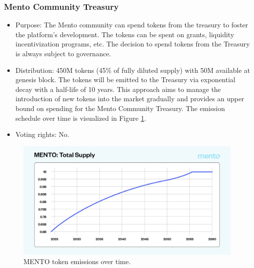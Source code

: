 \documentclass[a4paper]{article}
\theoremstyle{definition}
\begin{document}
\subsubsection*{Mento Community Treasury}
\begin{itemize}
    \item Purpose: The Mento community can spend tokens from the treasury to foster the platform's development. The tokens can be spent on grants, liquidity incentivization programs, etc. The decision to spend tokens from the Treasury is always subject to governance.
    \item Distribution: 450M tokens (45\% of fully diluted supply) with 50M available at genesis block. The tokens will be emitted to the Treasury via exponential decay with a half-life of 10 years. This approach aims to manage the introduction of new tokens into the market gradually and provides an upper bound on spending for the Mento Community Treasury. The emission schedule over time is visualized in Figure \ref{fig:mento_emissions}.
    \item Voting rights: No.
\end{itemize}
\begin{figure}[ht]
    \centering
    \includegraphics[width=1\linewidth]{figures/mento_emissions.png}
    \caption{MENTO token emissions over time.}
    \label{fig:mento_emissions}
\end{figure}
\end{document}
